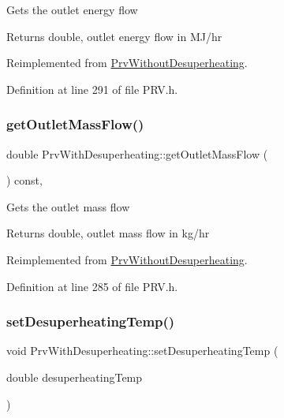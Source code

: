 Gets the outlet energy flow \begin{DoxyReturn}{Returns}
double, outlet energy flow in M\+J/hr 
\end{DoxyReturn}


Reimplemented from \hyperlink{class_prv_without_desuperheating_a6529a68ffa444ae87c890b2bcbc2cc84}{Prv\+Without\+Desuperheating}.



Definition at line 291 of file P\+R\+V.\+h.

\mbox{\label{class_prv_with_desuperheating_a848a898a392dd7abfb030d0ca1653454}} 
\subsubsection{\texorpdfstring{get\+Outlet\+Mass\+Flow()}{getOutletMassFlow()}}
{\footnotesize\ttfamily double Prv\+With\+Desuperheating\+::get\+Outlet\+Mass\+Flow (\begin{DoxyParamCaption}{ }\end{DoxyParamCaption}) const\hspace{0.3cm}{\ttfamily [inline]}, {\ttfamily [virtual]}}

Gets the outlet mass flow \begin{DoxyReturn}{Returns}
double, outlet mass flow in kg/hr 
\end{DoxyReturn}


Reimplemented from \hyperlink{class_prv_without_desuperheating_aefe4227f2c01209ba4ce79f6b5825d73}{Prv\+Without\+Desuperheating}.



Definition at line 285 of file P\+R\+V.\+h.

\mbox{\label{class_prv_with_desuperheating_ade1b153c495efb451006b3c054ff386e}} 
\subsubsection{\texorpdfstring{set\+Desuperheating\+Temp()}{setDesuperheatingTemp()}}
{\footnotesize\ttfamily void Prv\+With\+Desuperheating\+::set\+Desuperheating\+Temp (\begin{DoxyParamCaption}\item[{double}]{desuperheating\+Temp }\end{DoxyParamCaption})\hspace{0.3cm}{\ttfamily [inline]}}

